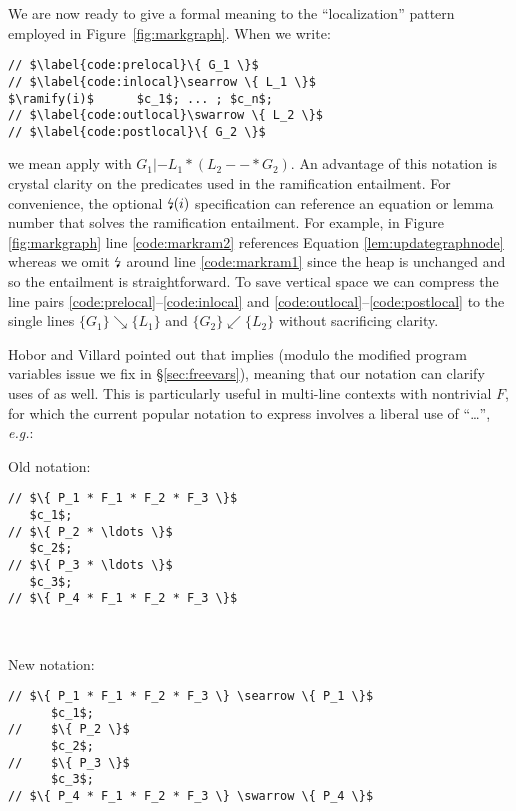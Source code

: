 We are now ready to give a formal meaning to the ``localization'' pattern employed in Figure~\ref{fig:markgraph}.  When we write:
\vspace{-4ex}
\begin{lstlisting}
// $\label{code:prelocal}\{ G_1 \}$
// $\label{code:inlocal}\searrow \{ L_1 \}$
$\ramify(i)$      $c_1$; ... ; $c_n$;
// $\label{code:outlocal}\swarrow \{ L_2 \}$
// $\label{code:postlocal}\{ G_2 \}$
\end{lstlisting}
\vspace{-1.5ex}
we mean apply  with $G_1 |- L_1 * (L_2 --* G_2)$.
An advantage of this notation is crystal clarity on the predicates used in the ramification entailment.  For convenience, the optional $\mbox{\lightning}(i)$ specification can reference an equation or lemma number that solves the ramification entailment.  For example, in Figure \ref{fig:markgraph} line \ref{code:markram2} references Equation \eqref{lem:updategraphnode} whereas we omit $\mbox{\lightning}$ around line \ref{code:markram1} since the heap is unchanged and so the entailment is straightforward. To save vertical space we can compress the line pairs \ref{code:prelocal}--\ref{code:inlocal} and \ref{code:outlocal}--\ref{code:postlocal}
to the single lines $\{ G_1 \} \searrow \{ L_1 \}$ and $\{ G_2 \} \swarrow \{ L_2 \}$ without sacrificing clarity.

Hobor and Villard pointed out that  implies  (modulo the modified program variables issue we fix in \S\ref{sec:freevars}), meaning that our notation can clarify uses of  as well.  This is particularly useful in multi-line contexts with nontrivial $F$, for which the current popular notation to express  involves a liberal use of ``\ldots'', \emph{e.g.}:

\vspace{5pt}

\begin{minipage}{.19\textwidth}
Old notation:
\begin{lstlisting}
// $\{ P_1 * F_1 * F_2 * F_3 \}$
   $c_1$;
// $\{ P_2 * \ldots \}$
   $c_2$;
// $\{ P_3 * \ldots \}$
   $c_3$;
// $\{ P_4 * F_1 * F_2 * F_3 \}$
\end{lstlisting}
\end{minipage} \vline ~~~
\begin{minipage}{.2\textwidth}
New notation:
\begin{lstlisting}[numbers=none]
// $\{ P_1 * F_1 * F_2 * F_3 \} \searrow \{ P_1 \}$
      $c_1$;
//    $\{ P_2 \}$
      $c_2$;
//    $\{ P_3 \}$
      $c_3$;
// $\{ P_4 * F_1 * F_2 * F_3 \} \swarrow \{ P_4 \}$
\end{lstlisting}
\end{minipage}
\vspace{-0.75ex}
